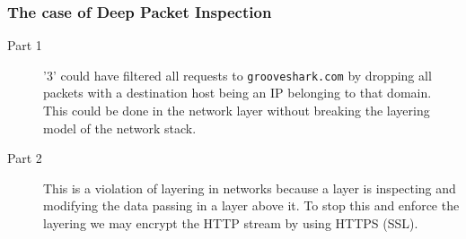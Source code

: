 \documentclass[a4paper]{article}
\begin{document}
\subsubsection{The case of Deep Packet Inspection}
\begin{description}
    \item[Part 1] '3' could have filtered all requests to \texttt{grooveshark.com} by dropping all packets
        with a destination host being an IP belonging to that domain. This could be done in the network layer without
        breaking the layering model of the network stack.
    \item[Part 2] This is a violation of layering in networks because a layer is inspecting and modifying
        the data passing in a layer above it. To stop this and enforce the layering we may encrypt the HTTP
        stream by using HTTPS (SSL).
\end{description}


\end{document}
